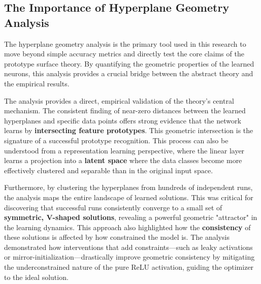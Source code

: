 \subsection*{The Importance of Hyperplane Geometry Analysis}
\label{sec:analysis-importance}

The hyperplane geometry analysis is the primary tool used in this research to 
move beyond simple accuracy metrics and directly test the core claims of the 
prototype surface theory. By quantifying the geometric properties of the 
learned neurons, this analysis provides a crucial bridge between the abstract 
theory and the empirical results.

The analysis provides a direct, empirical validation of the theory's central 
mechanism. The consistent finding of near-zero distances between the learned 
hyperplanes and specific data points offers strong evidence that the network 
learns by \textbf{intersecting feature prototypes}. This geometric 
intersection is the signature of a successful prototype recognition. This 
process can also be understood from a representation learning perspective, 
where the linear layer learns a projection into a \textbf{latent space} where 
the data classes become more effectively clustered and separable than in the 
original input space.

Furthermore, by clustering the hyperplanes from hundreds of independent runs, 
the analysis maps the entire landscape of learned solutions. This was critical 
for discovering that successful runs consistently converge to a small set of 
\textbf{symmetric, V-shaped solutions}, revealing a powerful geometric 
"attractor" in the learning dynamics. This approach also highlighted how the 
\textbf{consistency} of these solutions is affected by how constrained the model 
is. The analysis demonstrated how interventions that add constraints—such as 
leaky activations or mirror-initialization—drastically improve geometric 
consistency by mitigating the underconstrained nature of the pure ReLU 
activation, guiding the optimizer to the ideal solution.